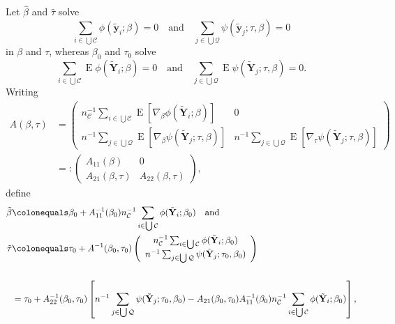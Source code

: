 \documentclass{article}
\newcommand{\defeq}{\ensuremath{\colonequals}}
\newcommand{\EE}{\operatorname{E}}
\begin{document}
Let $\hat\beta$ and $\hat\tau$ solve
\[\sum_{i\in \bigcup \mathcal{C}}\phi(\tilde{\mathbf{y}}_{i}; \beta )
  =0\quad\text{and}\quad
\sum_{j\in \bigcup \mathcal{Q}}\psi(\tilde{\mathbf{y}}_{j}; \tau, \beta )  =0
  \]
  in $\beta$ and $\tau$, whereas $\beta_{0}$ and $\tau_{0}$ solve 
\[\sum_{i\in \bigcup \mathcal{C}}\EE\phi(\tilde{\mathbf{Y}}_{i}; \beta )
  =0\quad\text{and}\quad
\sum_{j\in \bigcup \mathcal{Q}}\EE\psi(\tilde{\mathbf{Y}}_{j}; \tau, \beta )  =0.
  \]
  Writing
  \begin{align*}
    A(\beta, \tau) &= \left(
      \begin{array}{cc}
        n_{\mathcal{C}}^{-1}\sum_{i\in \bigcup
        \mathcal{C}}\EE [\nabla_{\beta}\phi(\tilde{\mathbf{Y}}_{i};
        \beta )]&0\\
        n^{-1}\sum_{j\in \bigcup
        \mathcal{Q}}\EE[ \nabla_{\beta}\psi(\tilde{\mathbf{Y}}_{j};
        \tau, \beta )]  & n^{-1}\sum_{j\in \bigcup
        \mathcal{Q}}\EE[ \nabla_{\tau}\psi(\tilde{\mathbf{Y}}_{j};
        \tau, \beta )]
      \end{array}
    \right)\\
    &=:\left(
      \begin{array}{cc}
        A_{11}(\beta)& 0\\
        A_{21}(\beta, \tau) & A_{22}(\beta, \tau)
      \end{array}
\right),
  \end{align*}
  define 
  \begin{align*}
   \tilde\beta &\defeq \beta_{0} + A_{11}^{-1}(\beta_{0})n_{\mathcal{C}}^{-1}\sum_{i\in \bigcup \mathcal{C}}\phi(\tilde{\mathbf{Y}}_{i}; \beta_{0})
  \quad \text{and}\\
    \tilde\tau &\defeq \tau_{0} + A^{-1}(\beta_{0}, \tau_{0})\left(
    \begin{array}{c}
      n_{\mathcal{C}}^{-1}\sum_{i\in \bigcup
      \mathcal{C}}\phi(\tilde{\mathbf{Y}}_{i}; \beta_{0})\\
      n^{-1}\sum_{j\in \bigcup
                 \mathcal{Q}}\psi(\tilde{\mathbf{Y}}_{j};
                 \tau_{0},\beta_{0} )
    \end{array}
\right)\\
    \\
               &=\tau_{0} + A_{22}^{-1}(\beta_{0}, \tau_{0})\left[                 
                 n^{-1}\sum_{j\in \bigcup
                 \mathcal{Q}}\psi(\tilde{\mathbf{Y}}_{j};
                 \tau_{0},\beta_{0} ) - A_{21}(\beta_{0}, \tau_{0}) A_{11}^{-1}(\beta_{0})n_{\mathcal{C}}^{-1}\sum_{i\in \bigcup \mathcal{C}}\phi(\tilde{\mathbf{Y}}_{i}; \beta_{0})\right],
\end{align*}
\end{document}
